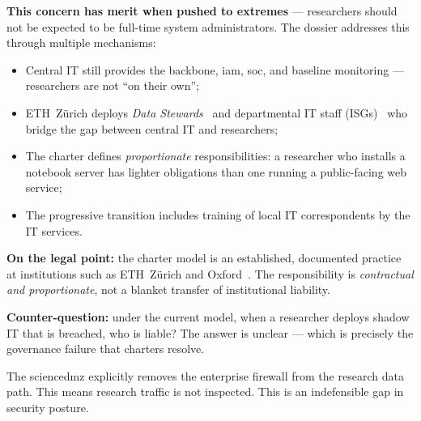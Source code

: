 \begin{answerbox}[Answer to Q3.2]
\textbf{This concern has merit when pushed to extremes} --- researchers should not be expected to be full-time system administrators. The dossier addresses this through multiple mechanisms:

\begin{itemize}[nosep]
    \item Central IT still provides the backbone, \gls{iam}, \gls{soc}, and baseline monitoring --- researchers are not ``on their own'';
    \item ETH~Z\"urich deploys \emph{Data Stewards}~\cite{eth-data-stewardship} and departmental IT staff (ISGs)~\cite{eth-isg-infk} who bridge the gap between central IT and researchers;
    \item The charter defines \emph{proportionate} responsibilities: a researcher who installs a notebook server has lighter obligations than one running a public-facing web service;
    \item The progressive transition includes training of local IT correspondents by the IT services.
\end{itemize}

\noindent\textbf{On the legal point:} the charter model is an established, documented practice at institutions such as ETH~Z\"urich and Oxford~\cite{eth-admin-agreement, oxford-infosec}. The responsibility is \emph{contractual and proportionate}, not a blanket transfer of institutional liability.

\medskip\noindent\textbf{Counter-question:} under the current model, when a researcher deploys shadow IT that is breached, who is liable? The answer is unclear --- which is precisely the governance failure that charters resolve.
\end{answerbox}

\bigskip

\begin{questionbox}
The \gls{sciencedmz} explicitly removes the enterprise firewall from the research data path. This means research traffic is not inspected. This is an indefensible gap in security posture.
\end{questionbox}


